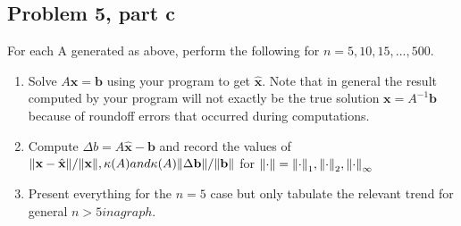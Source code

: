 \subsection{Problem 5, part c}
 For each A generated as above, perform the following for $n = 5, 10, 15, . . . , 500$.
 \begin{enumerate}
     \item Solve $A\textbf{x} = \textbf{b}$  using your program to get $\hat{\textbf{x}}$. Note that in general the result computed by your program will not exactly be the true solution $\textbf{x} = A^{-1}\textbf{b}$ because of roundoff errors that occurred during computations.
 
    \item Compute $\Delta b = A\hat{\textbf{x}} - \textbf{b}$ and record the values of $\norm{\textbf{x} - \hat{\textbf{x}}}/ \norm{\textbf{x}}, \kappa(A) and \kappa(A)\norm{\Delta \textbf{b}} / \norm{\textbf{b}}$ for $\norm{\cdot} = \norm{\cdot}_1, \norm{\cdot}_2, \norm{\cdot}_\infty$

    \item Present everything for the $n = 5$ case but only tabulate the relevant trend for general $n > 5 in a graph.$
 \end{enumerate}
\partbreak
